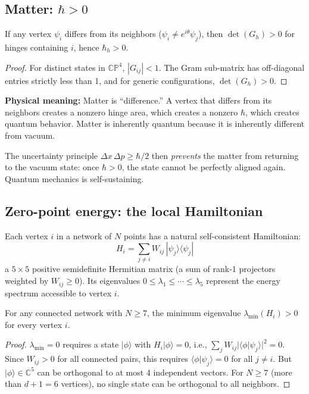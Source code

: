 \subsection{Matter: $\hbar > 0$}

\begin{proposition}
If any vertex $\psi_i$ differs from its neighbors ($\psi_i \neq e^{i\theta}\psi_j$), then $\det(G_h) > 0$ for hinges containing $i$, hence $\hbar_h > 0$.
\end{proposition}

\begin{proof}
For distinct states in $\mathbb{CP}^4$, $|G_{ij}| < 1$. The Gram sub-matrix has off-diagonal entries strictly less than 1, and for generic configurations, $\det(G_h) > 0$.
\end{proof}

\textbf{Physical meaning:} Matter is ``difference.'' A vertex that differs from its neighbors creates a nonzero hinge area, which creates a nonzero $\hbar$, which creates quantum behavior. Matter is inherently quantum because it is inherently different from vacuum.

The uncertainty principle $\Delta x\,\Delta p \geq \hbar/2$ then \emph{prevents} the matter from returning to the vacuum state: once $\hbar > 0$, the state cannot be perfectly aligned again. Quantum mechanics is self-sustaining.

\subsection{Zero-point energy: the local Hamiltonian}

Each vertex $i$ in a network of $N$ points has a natural self-consistent Hamiltonian:
\begin{equation}
H_i = \sum_{j \neq i} W_{ij}\,|\psi_j\rangle\langle\psi_j|
\end{equation}
a $5\times 5$ positive semidefinite Hermitian matrix (a sum of rank-1 projectors weighted by $W_{ij} \geq 0$). Its eigenvalues $0 \leq \lambda_1 \leq \cdots \leq \lambda_5$ represent the energy spectrum accessible to vertex $i$.

\begin{proposition}
For any connected network with $N \geq 7$, the minimum eigenvalue $\lambda_{\min}(H_i) > 0$ for every vertex $i$.
\end{proposition}

\begin{proof}
$\lambda_{\min} = 0$ requires a state $|\phi\rangle$ with $H_i|\phi\rangle = 0$, i.e., $\sum_j W_{ij}|\langle\phi|\psi_j\rangle|^2 = 0$. Since $W_{ij} > 0$ for all connected pairs, this requires $\langle\phi|\psi_j\rangle = 0$ for all $j \neq i$. But $|\phi\rangle \in \mathbb{C}^5$ can be orthogonal to at most 4 independent vectors. For $N \geq 7$ (more than $d + 1 = 6$ vertices), no single state can be orthogonal to all neighbors.
\end{proof}

